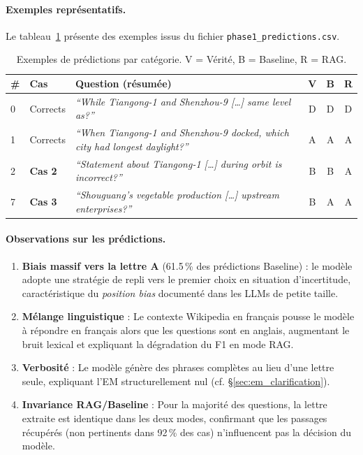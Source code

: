 \documentclass[12pt,a4paper]{article}
\begin{document}
\paragraph{Exemples représentatifs.}
Le tableau~\ref{tab:examples_quali} présente des exemples issus du fichier
\texttt{phase1\_predictions.csv}.

\begin{table}[H]
\centering
\caption{Exemples de prédictions par catégorie. V = Vérité, B = Baseline, R = RAG.}
\label{tab:examples_quali}
\small
\begin{tabularx}{\textwidth}{@{} p{0.5cm} p{0.9cm} X c c c @{}}
\toprule
\textbf{\#} & \textbf{Cas} & \textbf{Question (résumée)} & \textbf{V} & \textbf{B} & \textbf{R} \\
\midrule
0 & Corrects & \textit{``While Tiangong-1 and Shenzhou-9 [\ldots] same level as?''}
  & D & D & D \\
\rowcolor{lightgray}
1 & Corrects & \textit{``When Tiangong-1 and Shenzhou-9 docked, which city had longest daylight?''}
  & A & A & A \\
2 & \textbf{Cas 2} & \textit{``Statement about Tiangong-1 [\ldots] during orbit is incorrect?''}
  & B & B & A \\
\rowcolor{lightgray}
7 & \textbf{Cas 3} & \textit{``Shouguang's vegetable production [\ldots] upstream enterprises?''}
  & B & A & A \\
\bottomrule
\end{tabularx}
\end{table}

\paragraph{Observations sur les prédictions.}
\begin{enumerate}[leftmargin=*]
  \item \textbf{Biais massif vers la lettre A} (61.5\,\% des prédictions Baseline) :
  le modèle adopte une stratégie de repli vers le premier choix en situation
  d'incertitude, caractéristique du \textit{position bias} documenté dans les LLMs
  de petite taille.
  \item \textbf{Mélange linguistique} : Le contexte Wikipedia en français pousse
  le modèle à répondre en français alors que les questions sont en anglais,
  augmentant le bruit lexical et expliquant la dégradation du F1 en mode RAG.
  \item \textbf{Verbosité} : Le modèle génère des phrases complètes au lieu d'une
  lettre seule, expliquant l'EM structurellement nul (cf. §\ref{sec:em_clarification}).
  \item \textbf{Invariance RAG/Baseline} : Pour la majorité des questions, la lettre
  extraite est identique dans les deux modes, confirmant que les passages récupérés
  (non pertinents dans 92\,\% des cas) n'influencent pas la décision du modèle.
\end{enumerate}
\end{document}
